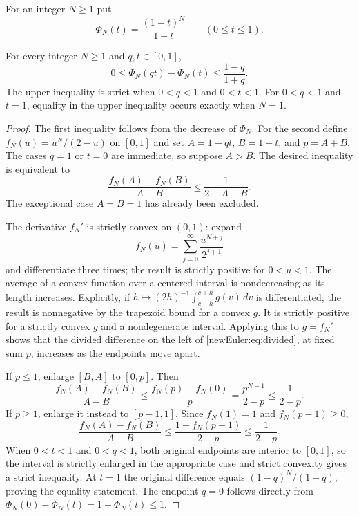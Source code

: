 For an integer $N\ge1$ put
\[
 \Phi_N(t)=\frac{(1-t)^N}{1+t}\qquad(0\le t\le1).
\]
\begin{lemma}
\label{newEuler:lem:scalar}
For every integer $N\ge1$ and $q,t\in[0,1]$,
\begin{equation}\label{newEuler:eq:scalar}
 0\le\Phi_N(qt)-\Phi_N(t)\le\frac{1-q}{1+q}.
\end{equation}
The upper inequality is strict when $0<q<1$ and $0<t<1$.
For $0<q<1$ and $t=1$, equality in the upper inequality occurs
exactly when $N=1$.
\end{lemma}
\begin{proof}
The first inequality follows from the decrease of $\Phi_N$. For the
second define $f_N(u)=u^N/(2-u)$ on $[0,1]$ and set
$A=1-qt$, $B=1-t$, and $p=A+B$. The cases $q=1$ or $t=0$ are
immediate, so suppose $A>B$. The desired inequality is equivalent to
\begin{equation}\label{newEuler:eq:divided}
 \frac{f_N(A)-f_N(B)}{A-B}\le\frac1{2-A-B}.
\end{equation}
The exceptional case $A=B=1$ has already been excluded.

The derivative $f_N'$ is strictly convex on $(0,1)$: expand
\[
 f_N(u)=\sum_{j=0}^{\infty}\frac{u^{N+j}}{2^{j+1}}
\]
and differentiate three times; the result is strictly positive for
$0<u<1$. The average of a convex function over a centered interval
is nondecreasing as its length increases. Explicitly, if
$h\mapsto (2h)^{-1}\int_{c-h}^{c+h}g(v)\,dv$ is differentiated,
the result is nonnegative by the trapezoid bound for a convex $g$.
It is strictly positive for a strictly convex $g$ and a nondegenerate
interval. Applying this to $g=f_N'$ shows that the divided difference
on the left of \eqref{newEuler:eq:divided}, at fixed sum $p$, increases
as the endpoints move apart.

If $p\le1$, enlarge $[B,A]$ to $[0,p]$. Then
\[
 \frac{f_N(A)-f_N(B)}{A-B}
 \le\frac{f_N(p)-f_N(0)}p
 =\frac{p^{N-1}}{2-p}\le\frac1{2-p}.
\]
If $p\ge1$, enlarge it instead to $[p-1,1]$. Since $f_N(1)=1$
and $f_N(p-1)\ge0$,
\[
 \frac{f_N(A)-f_N(B)}{A-B}
 \le\frac{1-f_N(p-1)}{2-p}\le\frac1{2-p}.
\]
When $0<t<1$ and $0<q<1$, both original endpoints are interior
to $[0,1]$, so the interval is strictly enlarged in the appropriate
case and strict convexity gives a strict inequality. At $t=1$ the
original difference equals $(1-q)^N/(1+q)$, proving the equality
statement. The endpoint $q=0$ follows directly from
$\Phi_N(0)-\Phi_N(t)=1-\Phi_N(t)\le1$.
\end{proof}

